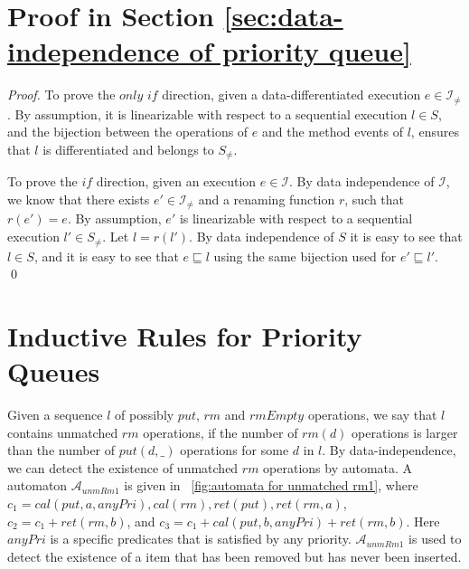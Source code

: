 \section{Proof in Section \ref{sec:data-independence of priority queue}}
\label{sec:appendix in section data-independence of PQ}


\DataDifferentiatedisEnoughforPQ

\begin {proof}

To prove the $\textit{only if}$ direction, given a data-differentiated execution $e \in \mathcal{I}_{\neq}$. By assumption, it is linearizable with respect to a sequential execution $l \in S$, and the bijection between the operations of $e$ and the method events of $l$, ensures that $l$ is differentiated and belongs to $S_{\neq}$.

To prove the $\textit{if}$ direction, given an execution $e \in \mathcal{I}$. By data independence of $\mathcal{I}$, we know that there exists $e' \in \mathcal{I}_{\neq}$ and a renaming function $r$, such that $r(e') = e$. By assumption, $e'$ is linearizable with respect to a sequential execution $l' \in S_{\neq}$. Let $l=r(l')$. By data independence of $S$ it is easy to see that $l \in S$, and it is easy to see that $e \sqsubseteq l$  using the same bijection used for $e' \sqsubseteq l'$. \qed
\end {proof}





\section{Inductive Rules for Priority Queues}
\label{sec:inductive rules for priority queues}



Given a sequence $l$ of possibly $\textit{put}$, $\textit{rm}$ and $\textit{rmEmpty}$ operations, we say that $l$ contains unmatched $\textit{rm}$ operations, if the number of $\textit{rm}(d)$ operations is larger than the number of $\textit{put}(d,\_)$ operations for some $d$ in $l$. By data-independence, we can detect the existence of unmatched $\textit{rm}$ operations by automata. A automaton $\mathcal{A}_{\textit{unmRm1}}$ is given in \figurename~\ref{fig:automata for unmatched rm1}, where $c_1=\textit{cal}(\textit{put},a,\textit{anyPri}),\textit{cal}(rm),\textit{ret}(\textit{put}),\textit{ret}(\textit{rm},a)$, $c_2=c_1 + \textit{ret}(\textit{rm},b)$, and $c_3 = c_1 + \textit{cal}(\textit{put},b,\textit{anyPri}) + \textit{ret}(\textit{rm},b)$. Here $\textit{anyPri}$ is a specific predicates that is satisfied by any priority. $\mathcal{A}_{\textit{unmRm1}}$ is used to detect the existence of a item that has been removed but has never been inserted.

